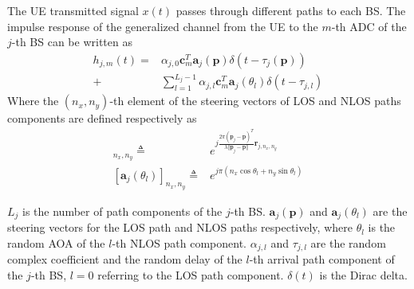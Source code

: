 \documentclass[journal]{IEEEtran}
\begin{document}
The UE transmitted signal $x(t)$ passes through different paths to each BS. The impulse response of the generalized channel from the UE to the $m$-th ADC of the $j$-th BS can be written as 
\begin{align}\label{IR}
  h_{j,m}(t)=&\alpha_{j,0}\boldsymbol{c}_m^T\boldsymbol{a}_j(\boldsymbol{p})\delta(t-\tau_j(\boldsymbol{p}))\\\nonumber
  +&\sum_{l=1}^{L_j-1}\alpha_{j,l}\boldsymbol{c}_m^T\boldsymbol{a}_j(\theta_l)\delta(t-\tau_{j,l})
\end{align}
Where the $(n_x,n_y)$-th element of the steering vectors of LOS and NLOS paths components are defined respectively as
\begin{align}
  [\boldsymbol{a}_j(\boldsymbol{p})]_{n_x,n_y}\triangleq& e^{j\frac{2\pi(\boldsymbol{p}_j-\boldsymbol{p})^T}{\lambda\Vert\boldsymbol{p}_j-\boldsymbol{p}\Vert}\boldsymbol{r}_{j,n_x,n_y}}\\ \nonumber
  [\boldsymbol{a}_j(\theta_l)]_{n_x,n_y}\triangleq&e^{j\pi(n_x\cos\theta_l+n_y\sin\theta_l)}
\end{align}

$L_j$ is the number of path components of the $j$-th BS. $\boldsymbol{a}_j(\boldsymbol{p})$ and $\boldsymbol{a}_j(\theta_l)$ are the steering vectors for the LOS path and NLOS paths respectively, where $\theta_l$ is the random AOA of the $l$-th NLOS path component. $\alpha_{j,l}$ and $\tau_{j,l}$ are the random complex coefficient and the random delay of the $l$-th arrival path component of the $j$-th BS, $l=0$ referring to the LOS path component. $\delta(t)$ is the Dirac delta.
\end{document}
